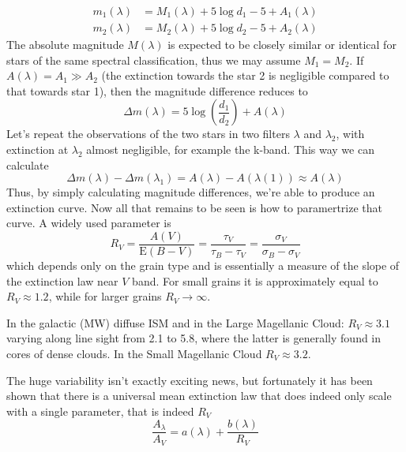 \begin{align*}
    m_{1}(\lambda) &= M_{1}(\lambda)+5\log d_{1} -5 +A_{1}(\lambda)\\
    m_{2}(\lambda) &= M_{2}(\lambda)+5\log d_{2} -5 +A_{2}(\lambda)
\end{align*}
The absolute magnitude $M(\lambda)$ is expected to be closely similar or identical for stars of the same spectral classification, thus we may assume  $M_{1} = M_{2}$. If $A(\lambda) = A_{1} \gg A_{2}$ (the extinction towards the star 2 is negligible compared to that towards star 1), then the magnitude difference reduces to
\begin{equation}
    \Delta m(\lambda) = 5\log\left(\frac{d_{1}}{d_{2}}\right) + A(\lambda)
    \label{eq:stellarpairing}
\end{equation}
Let’s repeat the observations of the two stars in two filters $\lambda$ and $\lambda_{2}$, with extinction at $\lambda_{2}$ almost negligible, for example the k-band. This way we can calculate
\begin{equation*}
    \Delta m(\lambda) - \Delta m(\lambda_{1}) = A(\lambda)-A(\lambda(1)) \approx A(\lambda)
\end{equation*}
Thus, by simply calculating magnitude differences, we're able to produce an extinction curve. Now all that remains to be seen is how to paramertrize that curve. A widely used parameter is 
\begin{equation}
    R_{V} = \frac{A(V)}{\text{E}(B-V)} = \frac{\tau_{V}}{\tau_{B}-\tau_{V}} = \frac{\sigma_{V}}{\sigma_{B}-\sigma_{V}}
\end{equation}
which depends only on the grain type and is essentially a measure of the slope of the extinction law near $V$ band. For small grains it is approximately equal to $R_{V}\approx 1.2$, while for larger grains $R_{V}\to \infty$.
\par In the galactic (MW) diffuse ISM and in the Large Magellanic Cloud: $R_{V}\approx 3.1$ varying along line sight from 2.1 to 5.8, where the latter is generally found in cores of dense clouds. In the Small Magellanic Cloud $R_{V}\approx 3.2$.
\par The huge variability isn't exactly exciting news, but fortunately it has been shown \cite{1989ApJ...345..245C} that there is a universal mean extinction law that does indeed only scale with a single parameter, that is indeed $R_{V}$
\begin{equation}
    \frac{A_{\lambda}}{A_{V}} = a(\lambda)+\frac{b(\lambda)}{R_{V}}
    \label{eq:extinctionlaw}
\end{equation} 

